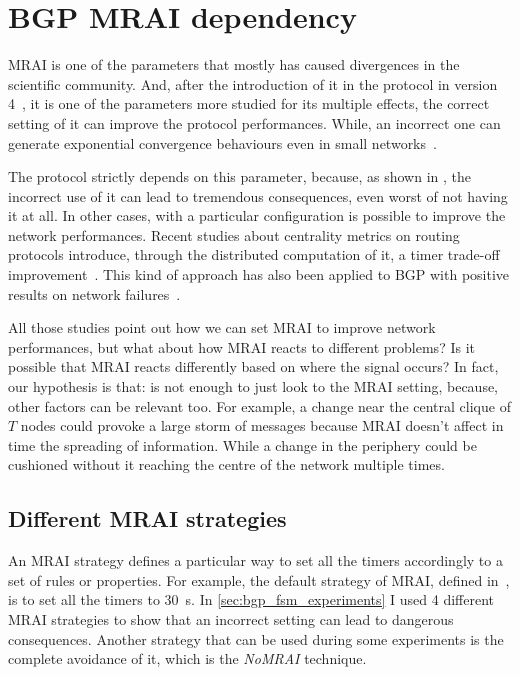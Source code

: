 \chapter{BGP MRAI dependency}
\label{cha:bgp_mrai_experiments}


\ac{MRAI} is one of the parameters that mostly has caused divergences in the
scientific community.
And, after the introduction of it in the protocol in version 4~\cite{rfc4271},
it is one of the parameters more studied for its multiple effects, the correct setting
of it can improve the protocol performances.
While, an incorrect one can generate exponential convergence behaviours even
in small networks~\cite{fabrikant2011there,griffin2001experimental}.

The protocol strictly depends on this parameter, because, as shown in ,
the incorrect use of it can lead to tremendous consequences, even worst of not
having it at all.
In other cases, with a particular configuration is possible to improve the network
performances.
Recent studies about centrality metrics on routing protocols introduce, through
the distributed computation of it, a timer trade-off
improvement~\cite{MaLo18_ToN,GhiMa18_infocom}.
This kind of approach has also been applied to \ac{BGP} with positive results on
network failures~\cite{milani2019BGP,milani2020improving}.

All those studies point out how we can set \ac{MRAI} to improve network
performances, but what about how \ac{MRAI} reacts to different problems?
Is it possible that \ac{MRAI} reacts differently based on where the signal
occurs?
In fact, our hypothesis is that: is not enough to just look to the \ac{MRAI} setting,
because, other factors can be relevant too.
For example, a change near the central clique of $T$ nodes could provoke a large
storm of messages because \ac{MRAI} doesn't affect in time the spreading of information.
While a change in the periphery could be cushioned without it reaching the centre
of the network multiple times.

\section{Different MRAI strategies}
\label{sec:bgp_mrai_strategies}

An \ac{MRAI} strategy defines a particular way to set all the timers accordingly
to a set of rules or properties.
For example, the default strategy of \ac{MRAI}, defined in~\cite{rfc4271}, is
to set all the timers to \SI{30}{\second}.
In \cref{sec:bgp_fsm_experiments} I used \num{4} different \ac{MRAI} strategies
to show that an incorrect setting can lead to dangerous consequences.
Another strategy that can be used during some experiments is the complete avoidance
of it, which is the \emph{NoMRAI} technique.

